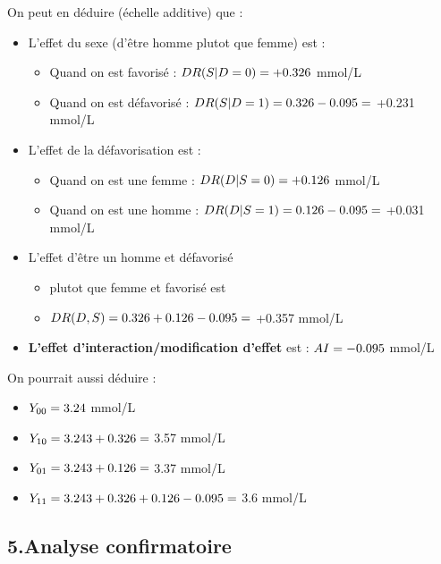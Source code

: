 \documentclass[
]{book}
\providecommand{\tightlist}{%
  \setlength{\itemsep}{0pt}\setlength{\parskip}{0pt}}
\begin{document}
On peut en déduire (échelle additive) que :

\begin{itemize}
\tightlist
\item
  L'effet du sexe (d'être homme plutot que femme) est :

  \begin{itemize}
  \tightlist
  \item
    Quand on est favorisé : \(\small DR(S|D=0) = +0.326\) mmol/L
  \item
    Quand on est défavorisé : \(\small DR(S|D=1) = 0.326 - 0.095 =\) +0.231 mmol/L
  \end{itemize}
\item
  L'effet de la défavorisation est :

  \begin{itemize}
  \tightlist
  \item
    Quand on est une femme : \(\small DR(D|S=0) = +0.126\) mmol/L
  \item
    Quand on est une homme : \(\small DR(D|S=1) = 0.126 - 0.095 =\) +0.031 mmol/L
  \end{itemize}
\item
  L'effet d'être un homme et défavorisé

  \begin{itemize}
  \tightlist
  \item
    plutot que femme et favorisé est
  \item
    \(\small DR(D,S) = 0.326 + 0.126 - 0.095 =\) +0.357 mmol/L
  \end{itemize}
\item
  \textbf{L'effet d'interaction/modification d'effet} est : \(\small AI = -0.095\) mmol/L
\end{itemize}

On pourrait aussi déduire :

\begin{itemize}
\tightlist
\item
  \(\small Y_{00} = 3.24\) mmol/L
\item
  \(\small Y_{10} = 3.243 + 0.326 =\) 3.57 mmol/L
\item
  \(\small Y_{01} = 3.243 + 0.126 =\) 3.37 mmol/L
\item
  \(\small Y_{11} = 3.243 + 0.326 + 0.126 - 0.095 =\) 3.6 mmol/L
\end{itemize}

\hypertarget{analyse-confirmatoire}{%
\subsection*{5.Analyse confirmatoire}\label{analyse-confirmatoire}}
\end{document}
